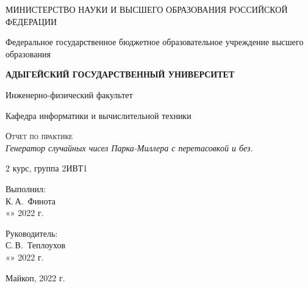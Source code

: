 \documentclass[12pt,a4paper]{scrartcl}
\begin{document}
	\begin{titlepage}
		\begin{center}
			\large
			МИНИСТЕРСТВО НАУКИ И ВЫСШЕГО ОБРАЗОВАНИЯ РОССИЙСКОЙ ФЕДЕРАЦИИ
			
			Федеральное государственное бюджетное образовательное учреждение высшего образования
			
			\textbf{АДЫГЕЙСКИЙ ГОСУДАРСТВЕННЫЙ УНИВЕРСИТЕТ}
			\vspace{0.25cm}
			
			Инженерно-физический факультет
			
			Кафедра информатики и вычислительной техники
			\vfill

			\vfill
			
			\textsc{Отчет по практике}\\[5mm]
			
			{\LARGE \textit{Генератор случайных чисел Парка-Миллера с перетасовкой и без.}}
			\bigskip
			
			2 курс, группа 2ИВТ1
		\end{center}
		\vfill
		
		\newlength{\ML}
		\hfill\begin{minipage}{0.5\textwidth}
			Выполнил:\\
			\underline{\hspace{\ML}} К.\,А.~Финота\\
			«\underline{\hspace{0.7cm}}» \underline{\hspace{2cm}} 2022 г.
		\end{minipage}%
		\bigskip
		
		\hfill\begin{minipage}{0.5\textwidth}
			Руководитель:\\
			\underline{\hspace{\ML}} С.\,В.~Теплоухов\\
			«\underline{\hspace{0.7cm}}» \underline{\hspace{2cm}} 2022 г.
		\end{minipage}%
		\vfill
		
		\begin{center}
			Майкоп, 2022 г.
		\end{center}
	\end{titlepage}
\end{document}
